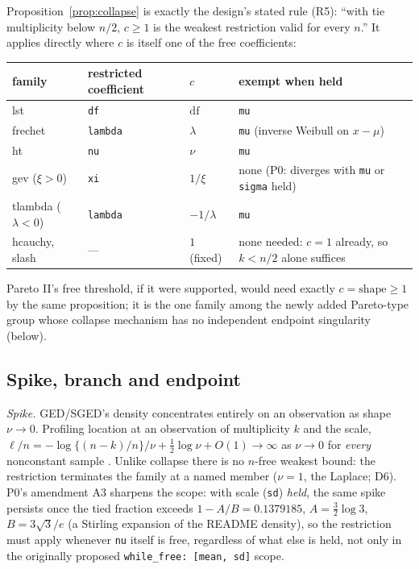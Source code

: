 \documentclass[11pt]{article}
\newcommand{\code}[1]{\texttt{#1}}
\theoremstyle{plain}
\theoremstyle{definition}
\theoremstyle{remark}
\begin{document}
Proposition~\ref{prop:collapse} is exactly the design's stated rule (R5):
``with tie multiplicity below $n/2$, $c\ge1$ is the weakest restriction
valid for every $n$.'' It applies directly where $c$ is itself one of the
free coefficients:

\begin{center}
\small
\begin{tabular}{@{}l l l l@{}}
\toprule
family & restricted coefficient & $c$ & exempt when held \\
\midrule
lst & \code{df} & $\mathrm{df}$ & \code{mu} \\
frechet & \code{lambda} & $\lambda$ & \code{mu} (inverse Weibull on $x-\mu$) \\
ht & \code{nu} & $\nu$ & \code{mu} \\
gev ($\xi>0$) & \code{xi} & $1/\xi$ & none (P0: diverges with \code{mu} or
  \code{sigma} held) \\
tlambda ($\lambda<0$) & \code{lambda} & $-1/\lambda$ & \code{mu} \\
hcauchy, slash & --- & $1$ (fixed) & none needed: $c=1$ already, so
  $k<n/2$ alone suffices \\
\bottomrule
\end{tabular}
\end{center}

Pareto II's free threshold, if it were supported, would need exactly
$c=\mathrm{shape}\ge1$ by the same proposition; it is the one family among
the newly added Pareto-type group whose collapse mechanism has no
independent endpoint singularity (below).

\subsection*{Spike, branch and endpoint}

\emph{Spike.} GED/SGED's density concentrates entirely on an observation as
shape $\nu\to0$. Profiling location at an observation of multiplicity $k$
and the scale, $\ell/n = -\log\{(n-k)/n\}/\nu + \tfrac12\log\nu + O(1) \to
\infty$ as $\nu\to0$ for \emph{every} nonconstant sample \cite{tumlinson2015}.
Unlike collapse there is no $n$-free weakest bound: the restriction
terminates the family at a named member ($\nu=1$, the Laplace; D6). P0's
amendment A3 sharpens the scope: with scale (\code{sd}) \emph{held}, the same
spike persists once the tied fraction exceeds $1-A/B = 0.1379185$,
$A=\tfrac32\log3$, $B=3\sqrt3/e$ (a Stirling expansion of the README
density), so the restriction must apply whenever \code{nu} itself is free,
regardless of what else is held, not only in the originally proposed
\code{while\_free: [mean, sd]} scope.
\end{document}
